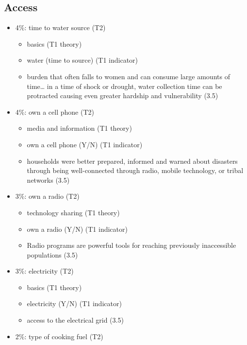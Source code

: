 \documentclass[
]{article}
\providecommand{\tightlist}{%
  \setlength{\itemsep}{0pt}\setlength{\parskip}{0pt}}
\begin{document}
\hypertarget{access}{%
\subsection{Access}\label{access}}

\begin{itemize}
\tightlist
\item
  4\%: time to water source (T2)

  \begin{itemize}
  \tightlist
  \item
    basics (T1 theory)
  \item
    water (time to source) (T1 indicator)
  \item
    burden that often falls to women and can consume large amounts of
    time\ldots{} in a time of shock or drought, water collection time
    can be protracted causing even greater hardship and vulnerability
    (3.5)
  \end{itemize}
\item
  4\%: own a cell phone (T2)

  \begin{itemize}
  \tightlist
  \item
    media and information (T1 theory)
  \item
    own a cell phone (Y/N) (T1 indicator)
  \item
    households were better prepared, informed and warned about disasters
    through being well-connected through radio, mobile technology, or
    tribal networks (3.5)
  \end{itemize}
\item
  3\%: own a radio (T2)

  \begin{itemize}
  \tightlist
  \item
    technology sharing (T1 theory)
  \item
    own a radio (Y/N) (T1 indicator)
  \item
    Radio programs are powerful tools for reaching previously
    inaccessible populations (3.5)
  \end{itemize}
\item
  3\%: electricity (T2)

  \begin{itemize}
  \tightlist
  \item
    basics (T1 theory)
  \item
    electricity (Y/N) (T1 indicator)
  \item
    access to the electrical grid (3.5)
  \end{itemize}
\item
  2\%: type of cooking fuel (T2)


\end{itemize}
\end{document}
